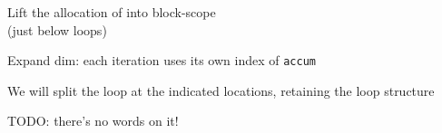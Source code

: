 \newpage
{}

{\large

}

{\LARGE
Lift the allocation of  into block-scope\\
(just below  loops)
}

\newpage
{}

{\large

}

{\LARGE
Expand dim: each iteration uses its own index of \texttt{accum}
}

\newpage
{}

{\large

}

{\LARGE
We will split the loop at the indicated locations, retaining the loop structure
}

\newpage

{\large

}
\newpage
{}

TODO: there's no words on it!

